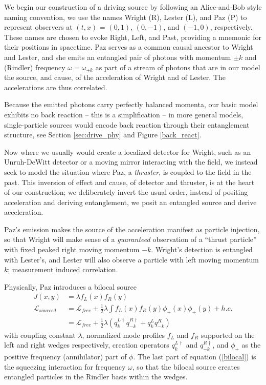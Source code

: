 \documentclass[12pt,a4paper]{article}
\begin{document}
We begin our construction of a driving source by following an Alice-and-Bob style naming convention, we use the names Wright (R), Lester (L), and Paz (P) to represent observers at $(t,x)$ = $(0,1)$, $(0,-1)$, and $(-1,0)$, respectively. These names are chosen to evoke Right, Left, and Past, providing a mnemonic for their positions in spacetime. Paz serves as a common causal ancestor to Wright and Lester, and she emits an entangled pair of photons with momentum $\pm k$ and (Rindler) frequency $\omega = \omega_{\pm k}$ as part of a stream of photons that are in our model the source, and cause, of the acceleration of Wright and of Lester.  The accelerations are thus correlated.

Because the emitted photons carry perfectly balanced momenta, our basic model exhibits no back reaction -- this is a simplification -- in more general models, single-particle sources would encode back reaction through their entanglement structure, see Section \ref{sec:drive_phy} and Figure \ref{back_react}.

Now where we usually would create a localized detector for Wright, such as an Unruh-DeWitt detector \cite{unruh1976notes} \cite{einstein1979general} or a moving mirror\cite{fulling1976radiation} interacting with the field, we instead seek to model the situation where Paz, a {\it thruster}, is coupled to the field in the past. This inversion of effect and cause, of detector and thruster, is at the heart of our construction; we deliberately invert the usual order, instead of positing acceleration and deriving entanglement, we posit an entangled source and derive acceleration. 

Paz's emission makes the source of the acceleration manifest as particle injection, so that Wright will make sense of a {\it guaranteed} observation of a ``thrust particle'' with fixed peaked right moving momentum $-k$. Wright’s detection is entangled with Lester’s, and Lester will also observe a particle with left moving momentum $k$; measurement induced correlation.  

Physically, Paz introduces a bilocal source 
\begin{equation}
  \begin{aligned}
    J(x,y) &= \lambda f_L(x)f_R(y)\\
    \mathscr{L}_{sourced} & = \mathscr{L}_{free} + \frac{1}{2}\lambda \int f_L(x)f_R(y) \phi_+(x) \phi_+(y)  + h.c.\\
                        &= \mathscr{L}_{free} + \frac{1}{2}\lambda \left(q_{k}^{L\dagger} q_{-k}^{R\dagger} + q_{k}^{L} q_{-k}^{R} \right)
 \end{aligned}
 \label{bilocal}
\end{equation}
with coupling constant $\lambda$, normalized mode profiles $f_L$ and $f_R$ supported on the left and right wedges respectively, creation operators $q_{k}^{L\dagger}$ and $q_{-k}^{R\dagger}$, and $\phi_+$ as the positive frequency (annihilator) part of $\phi$. The last part of equation (\ref{bilocal}) is the squeezing interaction for frequency $\omega$, so that the bilocal source creates entangled particles in the Rindler basis within the wedges.
\end{document}
